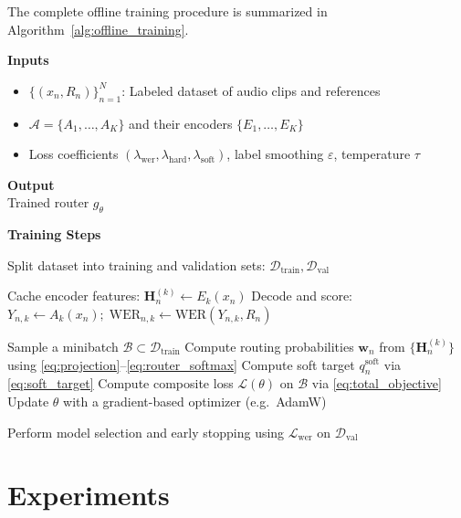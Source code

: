 \documentclass[journal]{IEEEtran}
\begin{document}
The complete offline training procedure is summarized in
Algorithm~\ref{alg:offline_training}.

\begin{algorithm}
\small
\caption{Offline Training of the Hierarchical Router}
\label{alg:offline_training}

\textbf{Inputs}
\begin{itemize}
\item $\{(x_n,R_n)\}_{n=1}^{N}$: Labeled dataset of audio clips and references
\item $\mathcal{A}=\{A_1,\dots,A_K\}$ and their encoders $\{E_1,\dots,E_K\}$
\item Loss coefficients $(\lambda_{\text{wer}},\lambda_{\text{hard}},\lambda_{\text{soft}})$, label smoothing $\varepsilon$, temperature $\tau$
\end{itemize}

\textbf{Output} \\
Trained router $g_{\theta}$

\textbf{Training Steps}
\begin{algorithmic}[1]
\State Split dataset into training and validation sets:
$\mathcal{D}_{\text{train}}, \mathcal{D}_{\text{val}}$

        \State Cache encoder features:
        $\mathbf{H}_n^{(k)} \gets E_k(x_n)$
        \State Decode and score:
        $Y_{n,k} \gets A_k(x_n);\;
        \mathrm{WER}_{n,k}\gets\mathrm{WER}(Y_{n,k},R_n)$
    \EndFor
\EndFor

    \State Sample a minibatch $\mathcal{B}\subset\mathcal{D}_{\text{train}}$
    \State Compute routing probabilities
    $\mathbf{w}_n$ from $\{\mathbf{H}_n^{(k)}\}$ using
    \eqref{eq:projection}--\eqref{eq:router_softmax}
    \State Compute soft target $q^{\mathrm{soft}}_n$ via \eqref{eq:soft_target}
    \State Compute composite loss $\mathcal{L}(\theta)$ on $\mathcal{B}$ via \eqref{eq:total_objective}
    \State Update $\theta$ with a gradient-based optimizer (e.g.\ AdamW)
\EndFor

\State Perform model selection and early stopping using
$\mathcal{L}_{\text{wer}}$ on $\mathcal{D}_{\text{val}}$
\end{algorithmic}
\end{algorithm}

\section{Experiments}
\label{sec:experiments}
\end{document}
